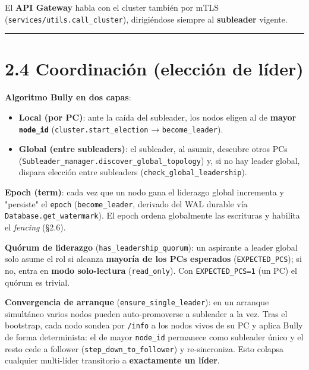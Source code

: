 \documentclass[11pt]{article}
\begin{document}
El \textbf{API Gateway} habla con el cluster también por mTLS (\texttt{services/\allowbreak{}utils.\allowbreak{}call\_\allowbreak{}cluster}), dirigiéndose siempre al \textbf{subleader} vigente.

\vspace{2pt}\noindent\rule{\textwidth}{0.4pt}\vspace{2pt}

\section{2.4 Coordinación (elección de líder)}

\textbf{Algoritmo Bully en dos capas}:

\begin{itemize}
\item \textbf{Local (por PC)}: ante la caída del subleader, los nodos eligen al de \textbf{mayor \texttt{node\_\allowbreak{}id}} (\texttt{cluster.\allowbreak{}start\_\allowbreak{}election} → \texttt{become\_\allowbreak{}leader}).
\item \textbf{Global (entre subleaders)}: el subleader, al asumir, descubre otros PCs (\texttt{Subleader\_\allowbreak{}manager.\allowbreak{}discover\_\allowbreak{}global\_\allowbreak{}topology}) y, si no hay leader global, dispara elección entre subleaders (\texttt{check\_\allowbreak{}global\_\allowbreak{}leadership}).
\end{itemize}

\textbf{Epoch (term)}: cada vez que un nodo gana el liderazgo global incrementa y "persiste" el \texttt{epoch} (\texttt{become\_\allowbreak{}leader}, derivado del WAL durable vía \texttt{Database.\allowbreak{}get\_\allowbreak{}watermark}). El epoch ordena globalmente las escrituras y habilita el \emph{fencing} (§2.6).

\textbf{Quórum de liderazgo} (\texttt{has\_\allowbreak{}leadership\_\allowbreak{}quorum}): un aspirante a leader global solo asume el rol si alcanza \textbf{mayoría de los PCs esperados} (\texttt{EXPECTED\_\allowbreak{}PCS}); si no, entra en \textbf{modo solo-lectura} (\texttt{read\_\allowbreak{}only}). Con \texttt{EXPECTED\_\allowbreak{}PCS=1} (un PC) el quórum es trivial.

\textbf{Convergencia de arranque} (\texttt{ensure\_\allowbreak{}single\_\allowbreak{}leader}): en un arranque simultáneo varios nodos pueden auto-promoverse a subleader a la vez. Tras el bootstrap, cada nodo sondea por \texttt{/\allowbreak{}info} a los nodos vivos de su PC y aplica Bully de forma determinista: el de mayor \texttt{node\_\allowbreak{}id} permanece como subleader único y el resto cede a follower (\texttt{step\_\allowbreak{}down\_\allowbreak{}to\_\allowbreak{}follower}) y re-sincroniza. Esto colapsa cualquier multi-líder transitorio a \textbf{exactamente un líder}.
\end{document}
